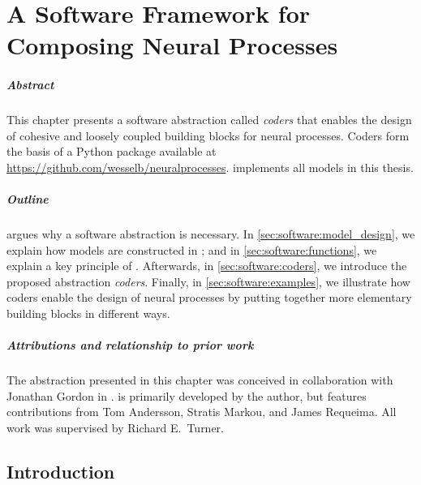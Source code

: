 \documentclass[12pt, twoside]{report}
\begin{document}
\chapter
    [A Software Framework for Composing Neural Processes]
    {A Software Framework for \tnl Composing Neural Processes}
\label{chap:software}

\paragraph{Abstract}
This chapter presents a software abstraction called \emph{coders}
that enables the design of 
cohesive and loosely coupled building blocks for neural processes.
Coders form the basis of a Python package  available at
\url{https://github.com/wesselb/neuralprocesses}.
 implements all models in this thesis.

\paragraph{Outline}
 argues why a software abstraction is necessary.
In \cref{sec:software:model_design},
we explain how models are constructed in ;
and in \cref{sec:software:functions}, we explain a key principle of .
Afterwards, in \cref{sec:software:coders}, we introduce the proposed abstraction \emph{coders}.
Finally, in \cref{sec:software:examples}, we illustrate how coders enable the design of neural processes by putting together more elementary building blocks in different ways.

\paragraph{Attributions and relationship to prior work}
The abstraction presented in this chapter was conceived in collaboration with Jonathan Gordon in  .
  is primarily developed by the author, but features contributions from Tom Andersson, Stratis Markou, and James Requeima.
All work was supervised by Richard E.\ Turner.

\section{Introduction}
\label{sec:software:introduction}
\end{document}
